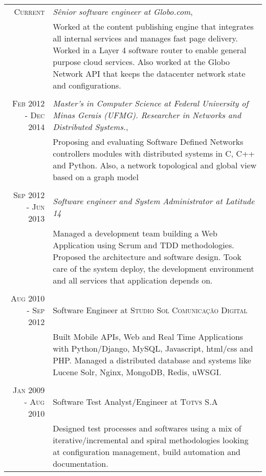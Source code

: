 \documentclass[a4paper,10pt]{article} %
\begin{document}
\begin{tabular}{r|p{11cm}}

\textsc{Current} & \emph{Sênior software engineer at Globo.com}, \\
& \footnotesize{Worked at the content publishing engine that integrates all
internal services and manages fast page delivery. Worked in a Layer 4 software
router to enable general purpose cloud services. Also worked at the Globo
Network API that keeps the datacenter network state and configurations.} \\
\multicolumn{2}{c}{} \\

\textsc{Feb 2012 - Dec 2014} & \emph{Master's in Computer Science at
Federal University of Minas Gerais (UFMG). Researcher in
Networks and Distributed Systems.}, \\
& \footnotesize{Proposing and evaluating Software Defined Networks controllers
modules with distributed systems in C, C++ and Python. Also, a network
topological and global view based on a graph model} \\
\multicolumn{2}{c}{} \\

\textsc{Sep 2012 - Jun 2013} & \emph{Software engineer and System
Administrator at Latitude 14} \\
& \footnotesize{Managed a development team building a Web Application using
Scrum and TDD methodologies.
Proposed the architecture and software design.
Took care of the system deploy, the development environment and all
services that application depends on.} \\
\multicolumn{2}{c}{} \\


\textsc{Aug 2010 - Sep 2012} & Software Engineer at \textsc{Studio Sol
Comunicação Digital}  \\
& \footnotesize{Built Mobile APIs, Web and Real Time Applications
with Python/Django, MySQL, Javascript, html/css and PHP.
Managed a distributed database and systems
like Lucene Solr, Nginx, MongoDB, Redis, uWSGI. }\\
\multicolumn{2}{c}{} \\


\textsc{Jan 2009 - Aug 2010} & Software Test Analyst/Engineer
at \textsc{Totvs S.A} \\
& \footnotesize{Designed test processes and softwares using a mix
of iterative/incremental and spiral methodologies looking at
configuration management, build automation and documentation.}
\end{tabular}
\end{document}
